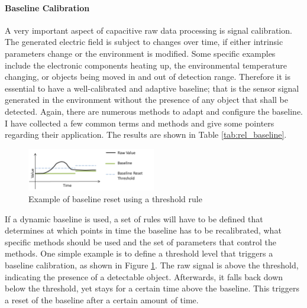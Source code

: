\paragraph{Baseline Calibration}
A very important aspect of capacitive raw data processing is signal calibration. The generated electric field is subject to changes over time, if either intrinsic parameters change or the environment is modified. Some specific examples include the electronic components heating up, the environmental temperature changing, or objects being moved in and out of detection range. Therefore it is essential to have a well-calibrated and adaptive baseline; that is the sensor signal generated in the environment without the presence of any object that shall be detected. Again, there are numerous methods to adapt and configure the baseline. I have collected a few common terms and methods and give some pointers regarding their application. The results are shown in Table \ref{tab:rel_baseline}. 
\begin{figure}[h]
\centering
\includegraphics[width=0.5\textwidth]{images/baseline_reset}
\caption{Example of baseline reset using a threshold rule}
\label{fig:rel_base_reset}
\end{figure} 
If a dynamic baseline is used, a set of rules will have to be defined that determines at which points in time the baseline has to be recalibrated, what specific methods should be used and the set of parameters that control the methods. One simple example is to define a threshold level that triggers a baseline calibration, as shown in Figure \ref{fig:rel_base_reset}. The raw signal is above the threshold, indicating the presence of a detectable object. Afterwards, it falls back down below the threshold, yet stays for a certain time above the baseline. This triggers a reset of the baseline after a certain amount of time.
